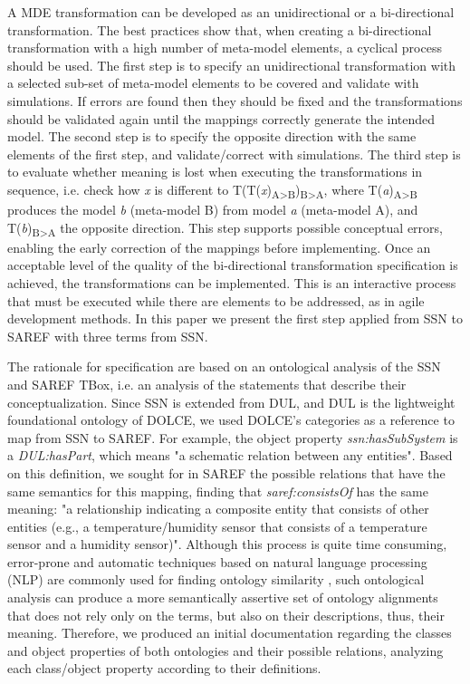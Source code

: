 \documentclass{sig-alternate-05-2015}
\begin{document}
A MDE transformation can be developed as an unidirectional or a bi-directional transformation. The best practices show that, when creating a bi-directional transformation with a high number of meta-model elements, a cyclical process should be used. The first step is to specify an unidirectional transformation with a selected sub-set of meta-model elements to be covered and validate with simulations. If errors are found then they should be fixed and the transformations should be validated again until the mappings correctly generate the intended model. The second step is to specify the opposite direction with the same elements of the first step, and validate/correct with simulations. The third step is to evaluate whether meaning is lost when executing the transformations in sequence, i.e. check how \textit{x} is different to T(T(\textit{x})\textsubscript{A>B})\textsubscript{B>A}, where T(\textit{a})\textsubscript{A>B} produces the model \textit{b} (meta-model B) from model \textit{a} (meta-model A), and T(\textit{b})\textsubscript{B>A} the opposite direction. This step supports possible conceptual errors, enabling the early correction of the mappings before implementing. Once an acceptable level of the quality of the bi-directional transformation specification is achieved, the transformations can be implemented. This is an interactive process that must be executed while there are elements to be addressed, as in agile development methods. In this paper we present the first step applied from SSN to SAREF with three terms from SSN.

The rationale for specification are based on an ontological analysis of the SSN and SAREF TBox, i.e. an analysis of the statements that describe their conceptualization. Since SSN is extended from DUL, and DUL is the lightweight foundational ontology of DOLCE, we used DOLCE's categories as a reference to map from SSN to SAREF. For example, the object property \textit{ssn:\-hasSubSystem} is a \textit{DUL:\-hasPart}, which means "a schematic relation between any entities". Based on this definition, we sought for in SAREF the possible relations that have the same semantics for this mapping, finding that \textit{saref:\-consistsOf} has the same meaning: "a relationship indicating a composite entity that consists of other entities (e.g., a temperature/humidity sensor that consists of a temperature sensor and a humidity sensor)". Although this process is quite time consuming, error-prone and automatic techniques based on natural language processing (NLP) are commonly used for finding ontology similarity \cite{Ganzha2015}, such ontological analysis can produce a more semantically assertive set of ontology alignments that does not rely only on the terms, but also on their descriptions, thus, their meaning. Therefore, we produced an initial documentation regarding the classes and object properties of both ontologies and their possible relations, analyzing each class/object property according to their definitions. 
\end{document}
